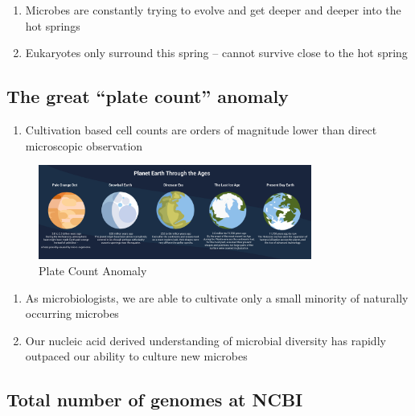 \documentclass[
]{book}
\providecommand{\tightlist}{%
  \setlength{\itemsep}{0pt}\setlength{\parskip}{0pt}}
\begin{document}
\begin{enumerate}
\def\labelenumi{\arabic{enumi}.}
\setcounter{enumi}{1}
\item
  Microbes are constantly trying to evolve and get deeper and deeper into the hot springs
\item
  Eukaryotes only surround this spring -- cannot survive close to the hot spring
\end{enumerate}

\hypertarget{the-great-plate-count-anomaly}{%
\subsection{The great ``plate count'' anomaly}\label{the-great-plate-count-anomaly}}

\begin{enumerate}
\def\labelenumi{\arabic{enumi}.}
\tightlist
\item
  Cultivation based cell counts are orders of magnitude lower than direct microscopic observation
\end{enumerate}

\begin{figure}
\centering
\includegraphics[width=0.8\textwidth,height=\textheight]{./Figures/Planets.png}
\caption{Plate Count Anomaly}
\end{figure}

\begin{enumerate}
\def\labelenumi{\arabic{enumi}.}
\setcounter{enumi}{1}
\item
  As microbiologists, we are able to cultivate only a small minority of naturally occurring microbes
\item
  Our nucleic acid derived understanding of microbial diversity has rapidly outpaced our ability to culture new microbes
\end{enumerate}

\hypertarget{total-number-of-genomes-at-ncbi}{%
\subsection{Total number of genomes at NCBI}\label{total-number-of-genomes-at-ncbi}}
\end{document}
